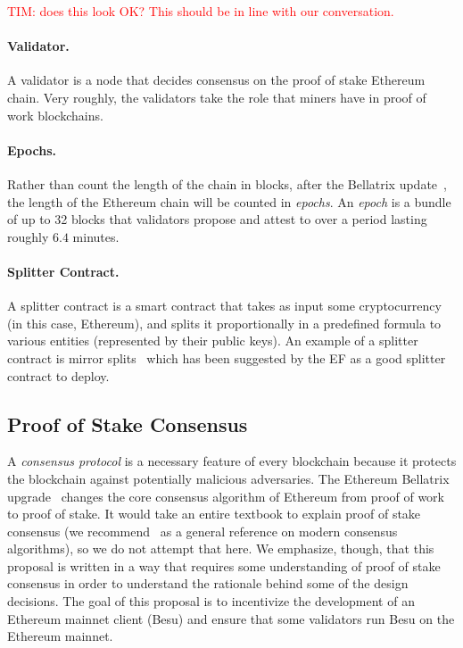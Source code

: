 \textcolor{red}{TIM:  does this look OK?  This should be in line with our conversation.}

\paragraph{Validator.}  A validator is a node that decides consensus on the proof of stake Ethereum chain.  Very roughly, the validators take the role that miners have in proof of work blockchains.

\paragraph{Epochs.}  Rather than count the length of the chain in blocks, after the Bellatrix update~\cite{EthBella}, the length of the Ethereum chain will be counted in \emph{epochs}.  An \emph{epoch} is a bundle of up to 32 blocks that validators propose and attest to over a period lasting roughly $6.4$ minutes.

\paragraph{Splitter Contract.}  A splitter contract is a smart contract that takes as input some cryptocurrency (in this case, Ethereum), and splits it proportionally in a predefined formula to various entities (represented by their public keys).  An example of a splitter contract is mirror splits~\cite{Mirror} which has been suggested by the EF as a good splitter contract to deploy.

\subsection{Proof of Stake Consensus}
A \emph{consensus protocol} is a necessary feature of every blockchain because it protects the blockchain against potentially malicious adversaries.  The Ethereum Bellatrix upgrade~\cite{EthBella} changes the core consensus algorithm of Ethereum from proof of work to proof of stake.  It would take an entire textbook to explain proof of stake consensus (we recommend~\cite{ShiBook} as a general reference on modern consensus algorithms), so we do not attempt that here.  We emphasize, though, that this proposal is written in a way that requires some understanding of proof of stake consensus in order to understand the rationale behind some of the design decisions.  The goal of this proposal is to incentivize the development of an Ethereum mainnet client (Besu) and ensure that some validators run Besu on the Ethereum mainnet.

